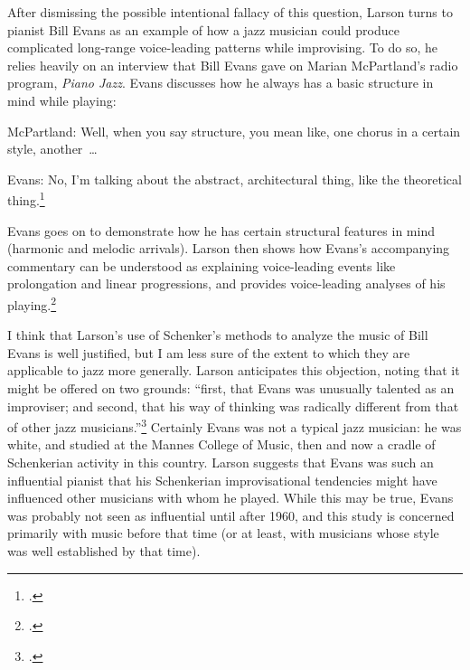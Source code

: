 \documentclass[diss]{subfiles}
\begin{document}
After dismissing the possible intentional fallacy of this question, Larson
turns to pianist Bill Evans as an example of how a jazz musician could produce
complicated long-range voice-leading patterns while improvising. To do so, he
relies heavily on an interview that Bill Evans gave on Marian McPartland’s
radio program, \emph{Piano Jazz}. Evans discusses how he always has
a basic structure in mind while playing:
\begin{quoting}
  \singlespacing
  McPartland: Well, when you say structure, you mean like, one chorus in a
  certain style, another~\ldots

  \vspace{\baselineskip} \noindent
  Evans: No, I’m talking about the abstract, architectural thing, like the
  theoretical thing.\footcite[219]{larson:1998}
\end{quoting}
Evans goes on to demonstrate how he has certain structural features in mind
(harmonic and melodic arrivals). Larson then shows how Evans’s accompanying
commentary can be understood as explaining  voice-leading events like
prolongation and linear progressions, and provides voice-leading analyses of
his playing.\footcite[See especially the table in][229]{larson:1998}

I think that Larson’s use of Schenker’s methods to analyze the music of Bill
Evans is well justified, but I am less sure of the extent to which they are
applicable to jazz more generally. Larson anticipates this objection, noting
that it might be offered on two grounds: “first, that Evans was unusually
talented as an improviser; and second, that his way of thinking was radically
different from that of other jazz musicians.”\footcite[239]{larson:1998}
Certainly Evans was not a typical jazz musician: he was white, and studied at
the Mannes College of Music, then and now a cradle of Schenkerian activity in
this country. Larson suggests that Evans was such an influential pianist
that his Schenkerian improvisational tendencies might have influenced other
musicians with whom he played. While this may be true, Evans was probably
not seen as influential until after 1960, and this study is concerned
primarily with music before that time (or at least, with musicians whose style
was well established by that time).
\end{document}
